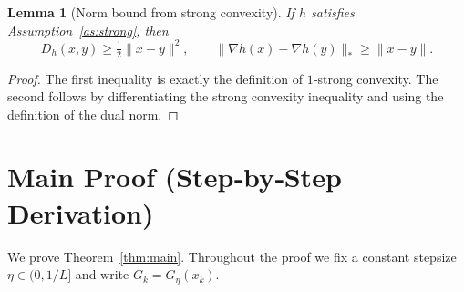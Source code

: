 \documentclass{article}
\newtheorem{lemma}{Lemma}
\newcommand{\Breg}[2]{D_{h}(#1,#2)}
\begin{document}
\begin{lemma}[Norm bound from strong convexity]\label{lem:sc}
If $h$ satisfies Assumption~\ref{as:strong}, then
\[
\Breg{x}{y}\ge\tfrac12\|x-y\|^{2},\qquad
\| \nabla h(x)-\nabla h(y) \|_{*}\ge \|x-y\|.
\]
\end{lemma}
\begin{proof}
The first inequality is exactly the definition of $1$‑strong convexity.
The second follows by differentiating the strong convexity inequality and using
the definition of the dual norm. \hfill\qedsymbol
\end{proof}

\section*{Main Proof (Step‑by‑Step Derivation)}
We prove Theorem~\ref{thm:main}. Throughout the proof we fix a constant stepsize
$\eta\in(0,1/L]$ and write $G_{k}=G_{\eta}(x_{k})$.
\end{document}
